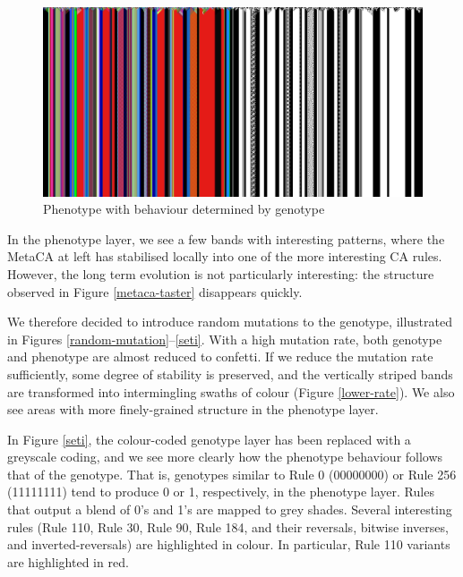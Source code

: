 \documentclass{AISB2008}
\begin{document}
\begin{figure}
\includegraphics[width=\columnwidth]{flag.png}
\caption{Phenotype with behaviour determined by genotype\label{flag}}
\end{figure}

In the phenotype layer, we see a few bands with interesting patterns,
where the MetaCA at left has stabilised locally into one of the more
interesting CA rules.  However, the long term evolution is not
particularly interesting: the structure observed in Figure
\ref{metaca-taster} disappears quickly.

We therefore decided to introduce random mutations to the genotype,
illustrated in Figures \ref{random-mutation}--\ref{seti}.  With a high
mutation rate, both genotype and phenotype are almost reduced to
confetti.  If we reduce the mutation rate sufficiently, some degree of
stability is preserved, and the vertically striped bands are
transformed into intermingling swaths of colour (Figure
\ref{lower-rate}).  We also see areas with more finely-grained
structure in the phenotype layer.  

In Figure \ref{seti}, the colour-coded genotype layer has been
replaced with a greyscale coding, and we see more clearly how the
phenotype behaviour follows that of the genotype.  That is, genotypes
similar to Rule 0 (00000000) or Rule 256 (11111111) tend to produce 0
or 1, respectively, in the phenotype layer.  Rules that output a blend
of 0's and 1's are mapped to grey shades.  Several interesting rules
(Rule 110, Rule 30, Rule 90, Rule 184, and their reversals, bitwise
inverses, and inverted-reversals) are highlighted in colour.  In
particular, Rule 110 variants are highlighted in red.

\end{document}
